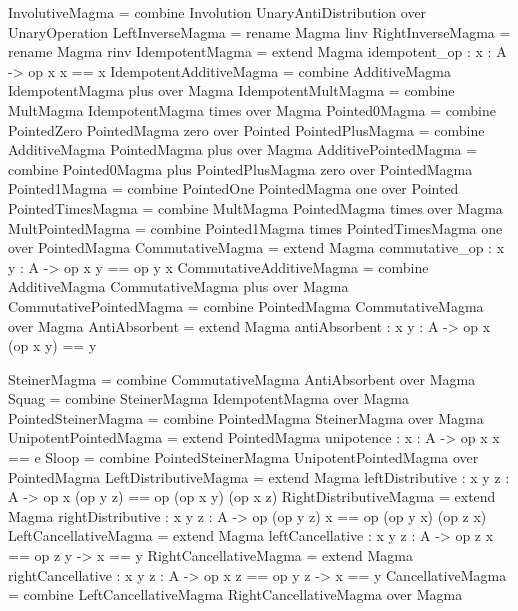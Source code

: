 \begin{togcode} 
InvolutiveMagma = 
  combine Involution {} UnaryAntiDistribution {} over UnaryOperation  
LeftInverseMagma = rename Magma linv
RightInverseMagma = rename Magma rinv 
IdempotentMagma = extend Magma {idempotent_op : {x : A} -> op x x == x} 
IdempotentAdditiveMagma =
  combine AdditiveMagma {} IdempotentMagma plus over Magma 
IdempotentMultMagma =
  combine MultMagma {} IdempotentMagma times over Magma 
Pointed0Magma = combine PointedZero {} PointedMagma zero over Pointed
PointedPlusMagma = combine AdditiveMagma {} PointedMagma plus over Magma
AdditivePointedMagma = 
  combine Pointed0Magma plus PointedPlusMagma zero over PointedMagma
Pointed1Magma = combine PointedOne {} PointedMagma one over Pointed
PointedTimesMagma = combine MultMagma {} PointedMagma times over Magma
MultPointedMagma = 
  combine Pointed1Magma times PointedTimesMagma one over PointedMagma
CommutativeMagma = 
  extend Magma {commutative_op : {x y : A} -> op x y == op y x}
CommutativeAdditiveMagma = 
  combine AdditiveMagma {} CommutativeMagma plus over Magma
CommutativePointedMagma = 
  combine PointedMagma {} CommutativeMagma {} over Magma
AntiAbsorbent = 
  extend Magma {antiAbsorbent : {x y : A} -> op x (op x y) == y}
\end{togcode}  

\begin{togcode} 
SteinerMagma = combine CommutativeMagma {} AntiAbsorbent {} over Magma 
Squag = combine SteinerMagma {} IdempotentMagma {} over Magma
PointedSteinerMagma = combine PointedMagma {} SteinerMagma {} over Magma
UnipotentPointedMagma = 
  extend PointedMagma {unipotence : {x : A} -> op x x == e}
Sloop = 
  combine PointedSteinerMagma {} UnipotentPointedMagma {} 
  over PointedMagma 
LeftDistributiveMagma  = 
  extend Magma 
     {leftDistributive : {x y z : A} -> 
          op x (op y z) == op (op x y) (op x z)}
RightDistributiveMagma = 
  extend Magma 
     {rightDistributive : {x y z : A} -> 
           op (op y z) x == op (op y x) (op z x)}
LeftCancellativeMagma  = 
  extend Magma 
     {leftCancellative : {x y z : A} -> op z x == op z y -> x == y }
RightCancellativeMagma = 
  extend Magma 
     {rightCancellative : {x y z : A} -> op x z == op y z -> x == y }
CancellativeMagma = 
  combine LeftCancellativeMagma {} RightCancellativeMagma {} 
  over Magma 
\end{togcode}  

